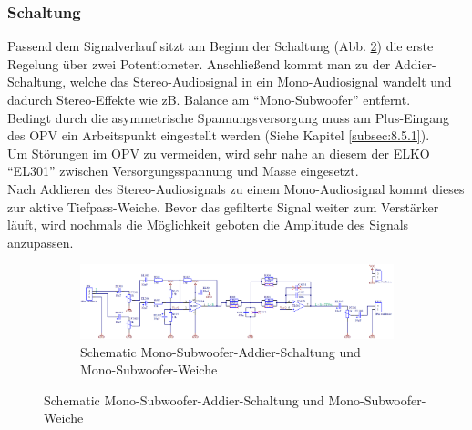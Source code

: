 \subsubsection{Schaltung}\label{subsec:5.5.2}
Passend dem Signalverlauf sitzt am Beginn der Schaltung (Abb. \ref{fig:5.5.2.1}) die erste Regelung über zwei Potentiometer.
Anschließend kommt man zu der Addier-Schaltung, welche das Stereo-Audiosignal in ein Mono-Audiosignal wandelt und dadurch Stereo-Effekte wie zB. Balance am \enquote{Mono-Subwoofer} entfernt.\\
Bedingt durch die asymmetrische Spannungsversorgung muss am Plus-Eingang des OPV ein Arbeitspunkt eingestellt werden (Siehe Kapitel \ref{subsec:8.5.1}).\\
Um Störungen im OPV zu vermeiden, wird sehr nahe an diesem der ELKO \enquote{EL301} zwischen Versorgungsspannung und Masse eingesetzt.\\
Nach Addieren des Stereo-Audiosignals zu einem Mono-Audiosignal kommt dieses zur aktive Tiefpass-Weiche.
Bevor das gefilterte Signal weiter zum Verstärker läuft, wird nochmals die Möglichkeit geboten die Amplitude des Signals anzupassen.
\begin{figure}
	\begin{figure} [H]
		\centering
		\includegraphics[width=\linewidth,height=0.9\textheight,keepaspectratio]{img/Print3/3mTTWeicheruAddiererDiplSchematic.PNG}
		\caption{Schematic Mono-Subwoofer-Addier-Schaltung und Mono-Subwoofer-Weiche}
		\label {fig:5.5.2.1}
	\end{figure}
\end{figure}
	


